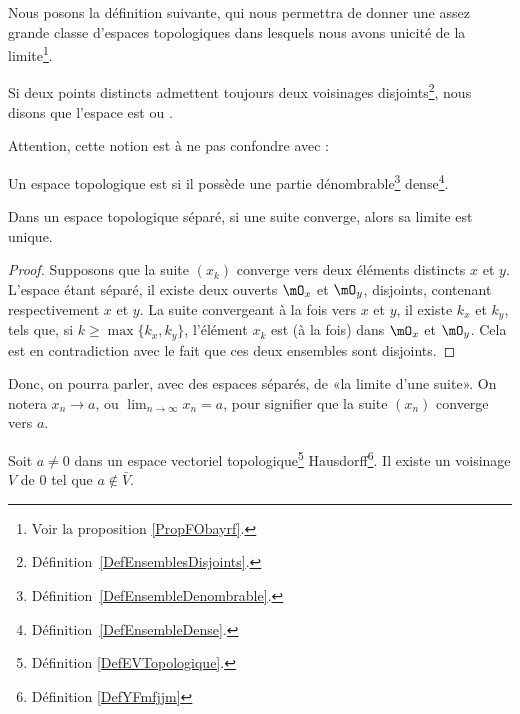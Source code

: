 Nous posons la définition suivante, qui nous permettra de donner une assez grande classe d'espaces topologiques dans lesquels nous avons unicité de la limite\footnote{Voir la proposition \ref{PropFObayrf}.}.
\begin{definition}  \label{DefYFmfjjm}
	Si deux points distincts admettent toujours deux voisinages disjoints\footnote{Définition~\ref{DefEnsemblesDisjoints}.}, nous disons que l'espace est  ou .
\end{definition}

Attention, cette notion est à ne pas confondre avec :
\begin{definition}  \label{DefUADooqilFK}
	Un espace topologique est  si il possède une partie dénombrable\footnote{Définition~\ref{DefEnsembleDenombrable}.} dense\footnote{Définition~\ref{DefEnsembleDense}.}.
\end{definition}

\begin{proposition}\label{PropUniciteLimitePourSuites}
	Dans un espace topologique séparé, si une suite converge, alors sa limite est unique.
\end{proposition}
\begin{proof}
	Supposons que la suite \( (x_k)\) converge vers deux éléments distincts \( x \) et \( y \). L'espace étant séparé, il existe deux ouverts \( \mO_x \) et \( \mO_y \), disjoints, contenant respectivement \( x \) et \( y \). La suite convergeant à la fois vers \( x \) et \( y \), il existe \( k_x \) et \( k_y \), tels que, si \( k \geq \max\{k_x, k_y\} \), l'élément  \( x_k \) est (à la fois) dans  \( \mO_x \) et \( \mO_y \). Cela est en contradiction avec le fait que ces deux ensembles sont disjoints.
\end{proof}

\begin{normaltext}
	Donc, on pourra parler, avec des espaces séparés, de «la limite d'une suite». On notera \( x_n\to a\), ou \(\lim_{n\to \infty} x_n = a \), pour signifier que la suite \( (x_n) \) converge vers \( a \).
\end{normaltext}

\begin{lemma}        \label{LEMooMDTNooThlHJl}
	Soit \( a\neq 0\) dans un espace vectoriel topologique\footnote{Définition \ref{DefEVTopologique}.} Hausdorff\footnote{Définition \ref{DefYFmfjjm}}. Il existe un voisinage \( V\) de \( 0\) tel que \( a\notin \bar V\).
\end{lemma}

